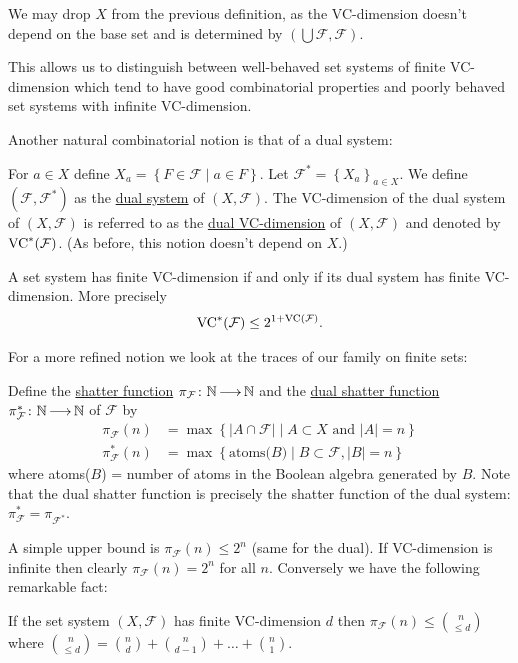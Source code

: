 \documentclass{amsart}
\newcommand{\F}{\mathcal F}
\newcommand{\curly}[1]{\left\{#1\right\}}
\newcommand{\defn}{\underline}
\begin{document}
\begin{Note}
  We may drop $X$ from the previous definition, as the VC-dimension doesn't depend on the base set and is determined by $(\bigcup \F, \F)$.
\end{Note}
This allows us to distinguish between well-behaved set systems of finite VC-dimension which tend to have good combinatorial properties and
poorly behaved set systems with infinite VC-dimension.

Another natural combinatorial notion is that of a dual system:
\begin{Definition}
  For $a \in X$ define $X_a = \curly{F \in \F \mid a \in F}$.
  Let $\F^* = \curly{X_a}_{a \in X}$.
  We define $(\F, \F^*)$ as the \defn{dual system} of $(X, \F)$.
  The VC-dimension of the dual system of $(X, \F)$ is referred to as the \defn{dual VC-dimension} of $(X, \F)$ and denoted by $\VC^*(\F)$.
  (As before, this notion doesn't depend on $X$.)
\end{Definition}  

\begin{Lemma}
  A set system has finite VC-dimension if and only if its dual system has finite VC-dimension.
  More precisely
  \begin{align*}
    \VC^*(\F) \leq 2^{1+\VC(\F)}.
  \end{align*}
\end{Lemma}

For a more refined notion we look at the traces of our family on finite sets:
\begin{Definition}
  Define the \defn{shatter function} $\pi_\F \colon \N \arr \N$ and the \defn{dual shatter function} $\pi^*_\F \colon \N \arr \N$ of $\F$ by 
  \begin{align*}
    \pi_\F(n) &= \max \curly{|A \cap \F| \mid A \subset X \text{ and } |A| = n} \\
	  \pi^*_\F(n) &= \max \curly{\text{atoms($B$)} \mid B \subset \F, |B| = n}
  \end{align*}
    where atoms($B$) = number of atoms in the Boolean algebra generated by $B$.
  Note that the dual shatter function is precisely the shatter function of the dual system: $\pi^*_\F = \pi_{\F^*}$.
\end{Definition}  

A simple upper bound is $\pi_\F(n) \leq 2^n$ (same for the dual).
If VC-dimension is infinite then clearly $\pi_\F(n) = 2^n$ for all $n$. Conversely we have the following remarkable fact:
\begin{Theorem} 
  If the set system $(X, \F)$ has finite VC-dimension $d$ then $\pi_\F(n) \leq {n \choose \leq d}$ where
  ${n \choose \leq d} = {n \choose d} + {n \choose d - 1} + \ldots + {n \choose 1}$.    
\end{Theorem}
\end{document}
